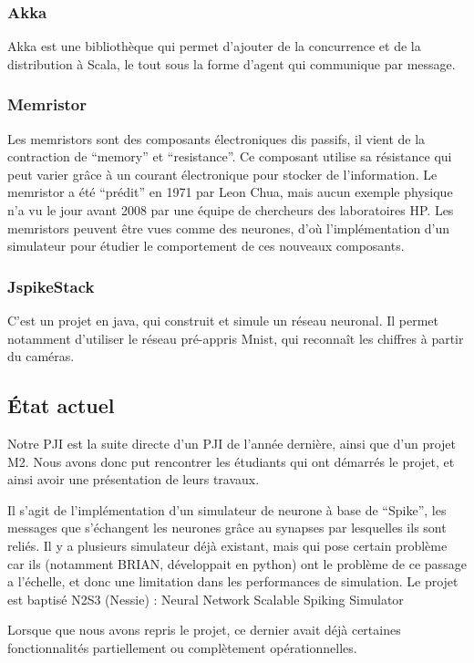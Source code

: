 \documentclass{article}
\begin{document}
        \subsubsection{Akka} Akka est une bibliothèque qui permet d’ajouter de la concurrence et de la distribution à Scala, le tout sous la forme d’agent qui communique par message.

        \subsubsection{Memristor} Les memristors sont des composants électroniques dis passifs, il vient de la contraction de “memory” et “resistance”. Ce composant utilise sa résistance qui peut varier grâce à un courant électronique pour stocker de l’information. Le memristor a été “prédit” en 1971 par Leon Chua, mais aucun exemple physique n’a vu le jour avant 2008 par une équipe de chercheurs des laboratoires HP. Les memristors peuvent être vues comme des neurones, d’où l’implémentation d’un simulateur pour étudier le comportement de ces nouveaux composants.
        
        \subsubsection{JspikeStack} C’est un projet en java, qui construit et simule un réseau neuronal. Il permet notamment d’utiliser le réseau pré-appris Mnist, qui reconnaît les chiffres à partir du caméras.

\subsection{État actuel}
Notre PJI est la suite directe d’un PJI de l’année dernière, ainsi que d’un projet M2. Nous avons donc put rencontrer les étudiants qui ont démarrés le projet, et ainsi avoir une présentation de leurs travaux.

Il s’agit de l’implémentation d’un simulateur de neurone à base de “Spike”, les messages que s’échangent les neurones grâce au synapses par lesquelles ils sont reliés. Il y a plusieurs simulateur déjà existant, mais qui pose certain problème car ils (notamment BRIAN, développait en python) ont le problème de ce passage a l’échelle, et donc une limitation dans les performances de simulation. Le projet est baptisé N2S3 (Nessie) : Neural Network Scalable Spiking Simulator

Lorsque que nous avons repris le projet, ce dernier avait déjà certaines fonctionnalités partiellement ou complètement opérationnelles.
\end{document}

